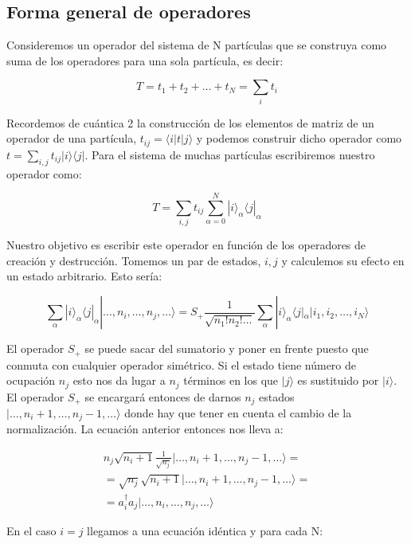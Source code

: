 \documentclass{article} %
\begin{document}
\subsection{Forma general de operadores}

Consideremos un operador del sistema de N partículas que se construya como suma de los operadores para una sola partícula, es decir:

$$
T = t_1 + t_2 + \ldots + t_N = \sum_i t_i
$$

Recordemos de cuántica 2 la construcción de los elementos de matriz de un operador de una partícula, $t_{ij} = \langle i | t | j \rangle$ y podemos construir dicho operador como $t = \sum_{i, j} t_{ij} |i\rangle \langle j |$. Para el sistema de muchas partículas escribiremos nuestro operador como:

\begin{equation}
T = \sum_{i,j} t_{ij} \sum_{\alpha = 0}^{N} |i\rangle_{\alpha} \langle j|_{\alpha}
\end{equation}

Nuestro objetivo es escribir este operador en función de los operadores de creación y destrucción. Tomemos un par de estados, $i, j$ y calculemos su efecto en un estado arbitrario. Esto sería:

$$
\sum_{\alpha} |i\rangle_{\alpha} \langle j|_{\alpha} |\ldots, n_i, \ldots, n_j, \ldots\rangle = S_+ \frac{1}{\sqrt{n_1! n_2! \ldots}} \sum_{\alpha} |i\rangle_{\alpha} \langle j|_{\alpha} | i_1, i_2, \ldots, i_N \rangle
$$

El operador $S_+$ se puede sacar del sumatorio y poner en frente puesto que conmuta con cualquier operador simétrico. Si el estado tiene número de ocupación $n_j$ esto nos da lugar a $n_j$ términos en los que $|j\rangle$ es sustituido por $|i\rangle$. El operador $S_+$ se encargará entonces de darnos $n_j$ estados $|\ldots, n_i+1, \ldots, n_j-1, \ldots\rangle$ donde hay que tener en cuenta el cambio de la normalización. La ecuación anterior entonces nos lleva a:

\begin{align*}
n_j \sqrt{n_i+1}\frac{1}{\sqrt{n_j}} |\ldots, n_i+1, \ldots, n_j-1, \ldots\rangle = \\ = \sqrt{n_j} \sqrt{n_i+1} |\ldots, n_i+1, \ldots, n_j-1, \ldots\rangle = \\ = a_i^{\dagger} a_j |\ldots, n_i, \ldots, n_j, \ldots\rangle
\end{align*}

En el caso $i = j$ llegamos a una ecuación idéntica y para cada N:
\end{document}
